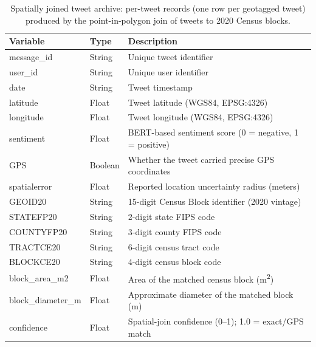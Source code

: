\documentclass[fleqn,10pt]{wlscirep}
\begin{document}
\begin{table}[htbp]
\centering
\caption{Spatially joined tweet archive: per-tweet records (one row per geotagged tweet) produced by the point-in-polygon join of tweets to 2020 Census blocks.}
\label{tab:census_tgsi}
\begin{tabular}{llp{8cm}}
\toprule
\textbf{Variable} & \textbf{Type} & \textbf{Description} \\
\midrule
message\_id & String & Unique tweet identifier \\
user\_id & String & Unique user identifier \\
date & String & Tweet timestamp \\
latitude & Float & Tweet latitude (WGS84, EPSG:4326) \\
longitude & Float & Tweet longitude (WGS84, EPSG:4326) \\
sentiment & Float & BERT-based sentiment score (0 = negative, 1 = positive) \\
GPS & Boolean & Whether the tweet carried precise GPS coordinates \\
spatialerror & Float & Reported location uncertainty radius (meters) \\
GEOID20 & String & 15-digit Census Block identifier (2020 vintage) \\
STATEFP20 & String & 2-digit state FIPS code \\
COUNTYFP20 & String & 3-digit county FIPS code \\
TRACTCE20 & String & 6-digit census tract code \\
BLOCKCE20 & String & 4-digit census block code \\
block\_area\_m2 & Float & Area of the matched census block (m\textsuperscript{2}) \\
block\_diameter\_m & Float & Approximate diameter of the matched block (m) \\
confidence & Float & Spatial-join confidence (0--1); 1.0 = exact/GPS match \\
\bottomrule
\end{tabular}
\end{table}
\end{document}
